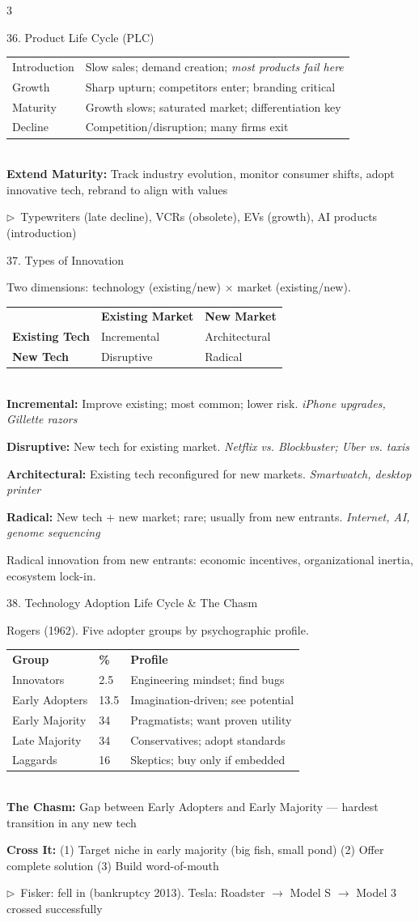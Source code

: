 \documentclass[7.5pt, letterpaper]{article}
\newcommand{\concept}[1]{%
  \vspace{2.5pt}%
  \noindent\colorbox{accent}{\parbox{\dimexpr\linewidth-2\fboxsep}{\fontsize{6.8pt}{7.5pt}\selectfont\bfseries\color{white}\strut #1\strut}}%
  \vspace{1pt}\par%
}
\newcommand{\kv}[2]{\noindent\textbf{#1:} #2\par}
\newcommand{\bul}[1]{\noindent$\triangleright$\ #1\par}
\newcommand{\minitab}[1]{%
  \begingroup
  \fontsize{6.2pt}{7pt}\selectfont
  \setlength{\tabcolsep}{2pt}
  #1
  \endgroup
}
\begin{document}
\begin{multicols}{3}
\concept{36. Product Life Cycle (PLC)}
\minitab{\begin{tabular}{@{}ll@{}}
Introduction & Slow sales; demand creation; \textit{most products fail here}\\
Growth & Sharp upturn; competitors enter; branding critical\\
Maturity & Growth slows; saturated market; differentiation key\\
Decline & Competition/disruption; many firms exit\\
\end{tabular}}\\
\kv{Extend Maturity}{Track industry evolution, monitor consumer shifts, adopt innovative tech, rebrand to align with values}
\bul{Typewriters (late decline), VCRs (obsolete), EVs (growth), AI products (introduction)}

\concept{37. Types of Innovation}
Two dimensions: technology (existing/new) $\times$ market (existing/new).\\
\minitab{\begin{tabular}{@{}lll@{}}
 & \textbf{Existing Market} & \textbf{New Market}\\
\textbf{Existing Tech} & Incremental & Architectural\\
\textbf{New Tech} & Disruptive & Radical\\
\end{tabular}}\\
\kv{Incremental}{Improve existing; most common; lower risk. \textit{iPhone upgrades, Gillette razors}}
\kv{Disruptive}{New tech for existing market. \textit{Netflix vs. Blockbuster; Uber vs. taxis}}
\kv{Architectural}{Existing tech reconfigured for new markets. \textit{Smartwatch, desktop printer}}
\kv{Radical}{New tech + new market; rare; usually from new entrants. \textit{Internet, AI, genome sequencing}}
Radical innovation from new entrants: economic incentives, organizational inertia, ecosystem lock-in.

\concept{38. Technology Adoption Life Cycle \& The Chasm}
Rogers (1962). Five adopter groups by psychographic profile.\\
\minitab{\begin{tabular}{@{}lll@{}}
\textbf{Group} & \textbf{\%} & \textbf{Profile}\\
Innovators & 2.5 & Engineering mindset; find bugs\\
Early Adopters & 13.5 & Imagination-driven; see potential\\
Early Majority & 34 & Pragmatists; want proven utility\\
Late Majority & 34 & Conservatives; adopt standards\\
Laggards & 16 & Skeptics; buy only if embedded\\
\end{tabular}}\\
\kv{The Chasm}{Gap between Early Adopters and Early Majority --- hardest transition in any new tech}
\kv{Cross It}{(1) Target niche in early majority (big fish, small pond) (2) Offer complete solution (3) Build word-of-mouth}
\bul{Fisker: fell in (bankruptcy 2013). Tesla: Roadster $\to$ Model S $\to$ Model 3 crossed successfully}


\end{multicols}
\end{document}
